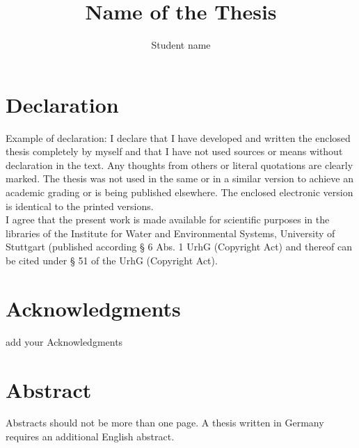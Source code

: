 \documentclass[11pt,twoside]{report}
\title{\textbf{Name of the Thesis}} %
\author{Student name} %
\begin{document}


\newpage\null\thispagestyle{empty}\newpage


\chapter*{Declaration}
{
	Example of declaration:
	I declare that I have developed and written the enclosed thesis completely by myself and that I have not used sources or means without declaration in the text. Any thoughts from others or literal quotations are clearly marked. The thesis was not used in the same or in a similar version to achieve an academic grading or is being published elsewhere. The enclosed electronic version is identical to the printed versions.\\
	
	I agree that the present work is made available for scientific purposes in the libraries of the Institute for Water and Environmental Systems, University of Stuttgart (published according § 6 Abs. 1 UrhG (Copyright Act) and thereof can be cited under § 51 of the UrhG (Copyright Act).
}

\chapter*{Acknowledgments}
{
add your Acknowledgments
}

\chapter*{Abstract}
{
Abstracts should not be more than one page. A thesis written in Germany requires an additional English abstract. 
}

\tableofcontents
\clearpage

\listoffigures
{}

\listoftables
{}

\pagestyle{fancy}
\fancyhf{}
\fancyhead[LE,RO]{\nouppercase{\leftmark}}
\fancyhead[RE,LO]{\nouppercase{\rightmark}}
\fancyfoot[LE,RO]{\thepage}
\renewcommand{\headrulewidth}{1.0pt}


	


	


\end{document}
